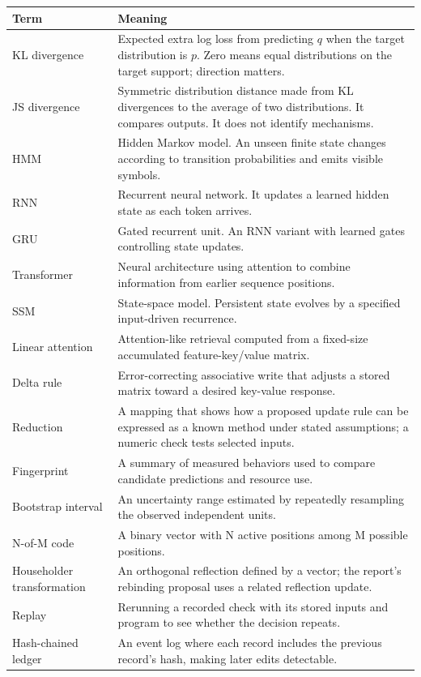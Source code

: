 \begin{longtable}{p{3.3cm}p{10.8cm}}
\toprule Term & Meaning \\
\midrule
KL divergence & Expected extra log loss from predicting $q$ when the target distribution is $p$. Zero means equal distributions on the target support; direction matters. \\
JS divergence & Symmetric distribution distance made from KL divergences to the average of two distributions. It compares outputs. It does not identify mechanisms. \\
HMM & Hidden Markov model. An unseen finite state changes according to transition probabilities and emits visible symbols. \\
RNN & Recurrent neural network. It updates a learned hidden state as each token arrives. \\
GRU & Gated recurrent unit. An RNN variant with learned gates controlling state updates. \\
Transformer & Neural architecture using attention to combine information from earlier sequence positions. \\
SSM & State-space model. Persistent state evolves by a specified input-driven recurrence. \\
Linear attention & Attention-like retrieval computed from a fixed-size accumulated feature-key/value matrix. \\
Delta rule & Error-correcting associative write that adjusts a stored matrix toward a desired key-value response. \\
Reduction & A mapping that shows how a proposed update rule can be expressed as a known method under stated assumptions; a numeric check tests selected inputs. \\
Fingerprint & A summary of measured behaviors used to compare candidate predictions and resource use. \\
Bootstrap interval & An uncertainty range estimated by repeatedly resampling the observed independent units. \\
N-of-M code & A binary vector with N active positions among M possible positions. \\
Householder transformation & An orthogonal reflection defined by a vector; the report's rebinding proposal uses a related reflection update. \\
Replay & Rerunning a recorded check with its stored inputs and program to see whether the decision repeats. \\
Hash-chained ledger & An event log where each record includes the previous record's hash, making later edits detectable. \\

\end{longtable}
